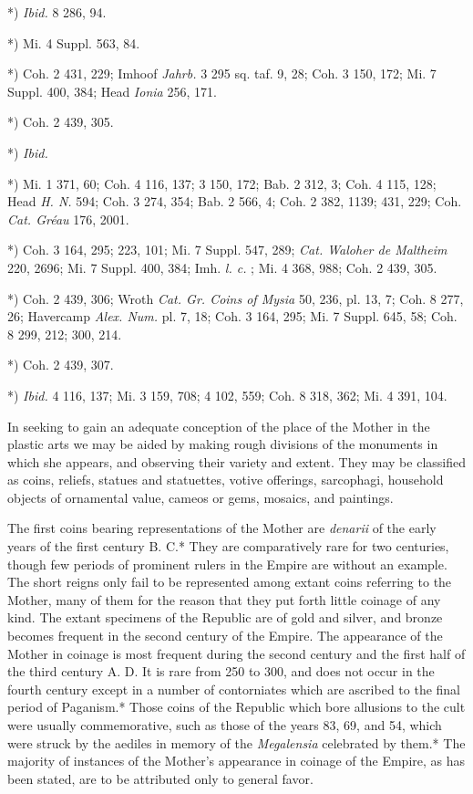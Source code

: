 \documentclass[a4paper, 11pt, oneside, polutonikogreek, english]{article}
\begin{document}
*) \emph{Ibid.} 8 286, 94.

*) Mi. 4 Suppl. 563, 84.

*) Coh. 2 431, 229; Imhoof \emph{Jahrb.} 3 295 sq. taf. 9, 28; Coh. 3 150, 172; Mi. 7 Suppl. 400, 384; Head \emph{Ionia} 256, 171.

*) Coh. 2 439, 305.

*) \emph{Ibid.}

*) Mi. 1 371, 60; Coh. 4 116, 137; 3 150, 172; Bab. 2 312, 3; Coh. 4 115, 128; Head \emph{H. N.} 594; Coh. 3 274, 354; Bab. 2 566, 4; Coh. 2 382, 1139; 431, 229; Coh. \emph{Cat. Gréau} 176, 2001.

*) Coh. 3 164, 295; 223, 101; Mi. 7 Suppl. 547, 289; \emph{Cat. Waloher de Maltheim} 220, 2696; Mi. 7 Suppl. 400, 384; Imh. \emph{l. c.} ; Mi. 4 368, 988; Coh. 2 439, 305.

*) Coh. 2 439, 306; Wroth \emph{Cat. Gr. Coins of Mysia} 50, 236, pl. 13, 7; Coh. 8 277, 26; Havercamp \emph{Alex. Num.} pl. 7, 18; Coh. 3 164, 295; Mi. 7 Suppl. 645, 58; Coh. 8 299, 212; 300, 214.

*) Coh. 2 439, 307.

*) \emph{Ibid.} 4 116, 137; Mi. 3 159, 708; 4 102, 559; Coh. 8 318, 362; Mi. 4 391, 104.

In seeking to gain an adequate conception of the place of the Mother in the plastic arts we may be aided by making rough divisions of the monuments in which she appears, and observing their variety and extent. They may be classified as coins, reliefs, statues and statuettes, votive offerings, sarcophagi, household objects of ornamental value, cameos or gems, mosaics, and paintings.

The first coins bearing representations of the Mother are \emph{denarii} of the early years of the first century B. C.* They are comparatively rare for two centuries, though few periods of prominent rulers in the Empire are without an example. The short reigns only fail to be represented among extant coins referring to the Mother, many of them for the reason that they put forth little coinage of any kind. The extant specimens of the Republic are of gold and silver, and bronze becomes frequent in the second century of the Empire. The appearance of the Mother in coinage is most frequent during the second century and the first half of the third century A. D. It is rare from 250 to 300, and does not occur in the fourth century except in a number of contorniates which are ascribed to the final period of Paganism.* Those coins of the Republic which bore allusions to the cult were usually commemorative, such as those of the years 83, 69, and 54, which were struck by the aediles in memory of the \emph{Megalensia} celebrated by them.* The majority of instances of the Mother's appearance in coinage of the Empire, as has been stated, are to be attributed only to general favor.
\end{document}
